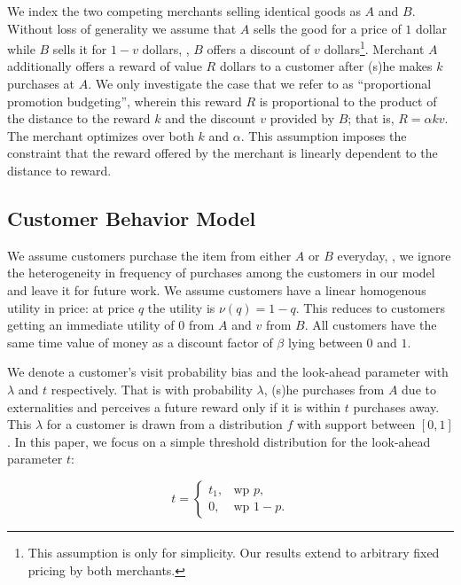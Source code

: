 We index the two competing merchants selling identical goods as $A$ and $B$.
Without loss of generality we assume that $A$ sells the good for a price of $1$ dollar while $B$ sells it for $1-v$ dollars, \ie, $B$ offers a discount of $v$ dollars\footnote{This assumption is only for simplicity. Our results extend to arbitrary fixed pricing by both merchants.}. 
Merchant $A$ additionally offers a reward of value $R$ dollars to a customer after (s)he makes $k$ purchases at $A$. 
We only investigate the case that we refer to as ``proportional promotion budgeting'', wherein this reward $R$ is proportional to the product of the distance to the reward $k$ and the discount $v$ provided by $B$;
that is, $R = \alpha k v$.
The merchant optimizes over both $k$ and $\alpha$.
This assumption imposes the constraint that the reward offered by the merchant is linearly dependent to the distance to reward.

\subsection{Customer Behavior Model}
We assume customers purchase the item from either $A$ or $B$ everyday, \ie, we ignore the heterogeneity in frequency of purchases among the customers in our model and leave it for future work.
We assume customers have a linear homogenous utility in price: at price $q$ the utility is $\nu(q) = 1-q$. 
This reduces to customers getting an immediate utility of $0$ from $A$ and $v$ from $B$.
All customers have the same time value of money as a discount factor of $\beta$ lying between $0$ and $1$.

We denote a customer's visit probability bias and the look-ahead parameter with $\lambda$ and $t$ respectively. 
That is with probability $\lambda$, (s)he purchases from $A$ due to externalities and perceives a future reward only if it is within $t$ purchases away. 
This $\lambda$ for a customer is drawn from a distribution $f$ with support between $[0,1]$.
In this paper, we focus on a simple threshold distribution for the look-ahead parameter $t$: 

\begin{equation*}
  t=\begin{cases}
    t_1, & \text{wp } p,\\
    0, & \text{wp } 1-p.
  \end{cases}
\end{equation*}

